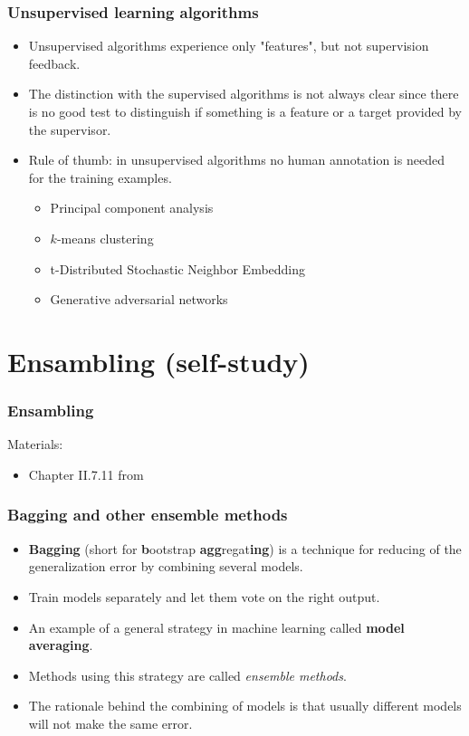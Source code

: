 \documentclass[notes]{beamer}          %
\newif\iffull
\begin{document}
\begin{frame}
\frametitle{Unsupervised learning algorithms}
    \begin{itemize}
        \item Unsupervised algorithms experience only "features", but not supervision feedback.
        \item The distinction with the supervised algorithms is not always clear since there is no good test to distinguish if something is a feature or a target provided by the supervisor.
        \item Rule of thumb: in unsupervised algorithms no human annotation is needed for the training examples.
        \begin{itemize}
            \item Principal component analysis
            \item $k$-means clustering
            \item t-Distributed Stochastic Neighbor Embedding
            \item Generative adversarial networks
        \end{itemize}
    \end{itemize}
\end{frame}



\iffull
\section{Ensambling}
\else
\section{Ensambling (self-study)}
\fi

\begin{frame}
\frametitle{Ensambling}
Materials:
\begin{itemize}
    \item Chapter II.7.11 from \cite{deeplearning}
\end{itemize}
\end{frame}

\iffull

\begin{frame}
\frametitle{Bagging and other ensemble methods}
    \begin{itemize}
        \item {\bf Bagging} (short for {\bf b}ootstrap {\bf agg}regat{\bf ing}) is a technique for reducing of the generalization error by combining several models.
        \item Train models separately and let them vote on the right output.
        \item An example of a general strategy in machine learning called {\bf model averaging}.
        \item Methods using this strategy are called {\em ensemble methods}.
        \item The rationale behind the combining of models is that usually different models will not make the same error.
    \end{itemize}
\end{frame}
\end{document}
